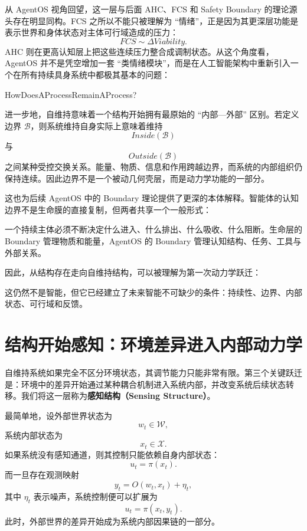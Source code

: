 从 AgentOS 视角回望，这一层与后面 AHC、FCS 和 Safety Boundary 的理论源头存在明显同构。FCS 之所以不能只被理解为 ``情绪''，正是因为其更深层功能是表示世界和身体状态对主体可行域造成的压力：
\[
FCS
\sim
\Delta Viability.
\]
AHC 则在更高认知层上把这些连续压力整合成调制状态。从这个角度看，AgentOS 并不是凭空增加一套 ``类情绪模块''，而是在人工智能架构中重新引入一个在所有持续具身系统中都极其基本的问题：
\begin{statementbox}
HowDoesAProcessRemainAProcess?
\end{statementbox}

进一步地，自维持意味着一个结构开始拥有最原始的 ``内部—外部'' 区别。若定义边界 $\mathcal B$，则系统维持自身实际上意味着维持
\[
Inside(\mathcal B)
\]
与
\[
Outside(\mathcal B)
\]
之间某种受控交换关系。能量、物质、信息和作用跨越边界，而系统的内部组织仍保持连续。因此边界不是一个被动几何壳层，而是动力学功能的一部分。

这也为后续 AgentOS 中的 Boundary 理论提供了更深的本体解释。智能体的认知边界不是生命膜的直接复制，但两者共享一个一般形式：
\begin{statementbox}
\centering
{}
\end{statementbox}
一个持续主体必须不断决定什么进入、什么排出、什么吸收、什么阻断。生命层的 Boundary 管理物质和能量，AgentOS 的 Boundary 管理认知结构、任务、工具与外部关系。

因此，从结构存在走向自维持结构，可以被理解为第一次动力学跃迁：
\begin{statementbox}
\centering
{}
\end{statementbox}
这仍然不是智能，但它已经建立了未来智能不可缺少的条件：持续性、边界、内部状态、可行域和反馈。

\section{结构开始感知：环境差异进入内部动力学}

自维持系统如果完全不区分环境状态，其调节能力只能非常有限。第三个关键跃迁是：环境中的差异开始通过某种耦合机制进入系统内部，并改变系统后续状态转移。我们将这一层称为\textbf{感知结构（Sensing Structure）}。

最简单地，设外部世界状态为
\[
w_t\in\mathcal W,
\]
系统内部状态为
\[
x_t\in\mathcal X.
\]
如果系统没有感知通道，则其控制只能依赖自身内部状态：
\[
u_t=\pi(x_t).
\]
而一旦存在观测映射
\[
y_t=O(w_t,x_t)+\eta_t,
\]
其中 $\eta_t$ 表示噪声，系统控制便可以扩展为
\[
u_t=\pi(x_t,y_t).
\]
此时，外部世界的差异开始成为系统内部因果链的一部分。

